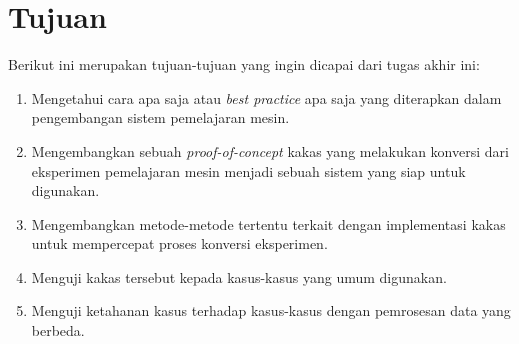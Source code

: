 \section{Tujuan}

Berikut ini merupakan tujuan-tujuan yang ingin dicapai dari tugas akhir ini:

\begin{enumerate}
    \item Mengetahui cara apa saja atau \textit{best practice} apa saja yang diterapkan dalam pengembangan sistem pemelajaran mesin.
    \item Mengembangkan sebuah \textit{proof-of-concept} kakas yang melakukan konversi dari eksperimen pemelajaran mesin menjadi sebuah sistem yang siap untuk digunakan.
    \item Mengembangkan metode-metode tertentu terkait dengan implementasi kakas untuk mempercepat proses konversi eksperimen.
    \item Menguji kakas tersebut kepada kasus-kasus yang umum digunakan.
    \item Menguji ketahanan kasus terhadap kasus-kasus dengan pemrosesan data yang berbeda.
\end{enumerate}